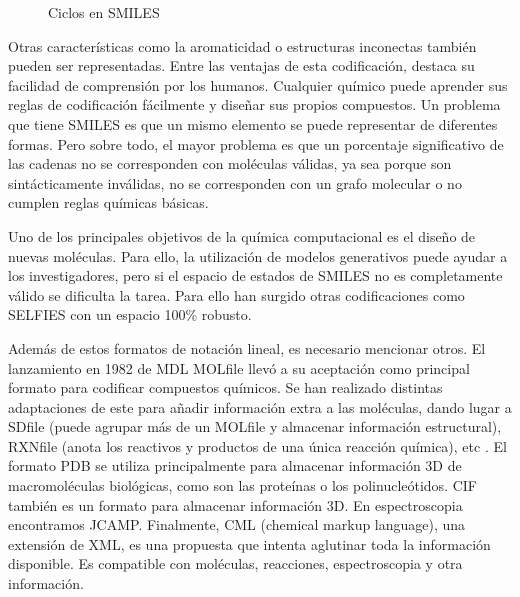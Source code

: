 \begin{figure}[H]
\centering
    \caption{Ciclos en SMILES} 
\end{figure}

Otras características como la aromaticidad o estructuras inconectas también pueden ser representadas. Entre las ventajas de esta codificación, destaca su facilidad de comprensión por los humanos. Cualquier químico puede aprender sus reglas de codificación fácilmente y diseñar sus propios compuestos. Un problema que tiene SMILES es que un mismo elemento se puede representar de diferentes formas. Pero sobre todo, el mayor problema es que un porcentaje significativo de las cadenas no se corresponden con moléculas válidas, ya sea porque son sintácticamente inválidas, no se corresponden con un grafo molecular o no cumplen reglas químicas básicas. \cite{weininger1988smiles}

Uno de los principales objetivos de la química computacional es el diseño de nuevas moléculas. Para ello, la utilización de modelos generativos puede ayudar a los investigadores, pero si el espacio de estados de SMILES no es completamente válido se dificulta la tarea. Para ello han surgido otras codificaciones como SELFIES con un espacio 100\% robusto. \cite{Krenn_2020}

Además de estos formatos de notación lineal, es necesario mencionar otros. El lanzamiento en 1982 de MDL MOLfile llevó a su aceptación como principal formato para codificar compuestos químicos. Se han realizado distintas adaptaciones de este para añadir información extra a las moléculas, dando lugar a SDfile (puede agrupar más de un MOLfile y almacenar información estructural), RXNfile (anota los reactivos y productos de una única reacción química), etc \cite{doi:10.1021/ci00007a012}. El formato PDB se utiliza principalmente para almacenar información 3D de macromoléculas biológicas, como son las proteínas o los polinucleótidos. CIF también es un formato para almacenar información 3D. En espectroscopia encontramos JCAMP. Finalmente, CML (chemical markup language), una extensión de XML, es una propuesta que intenta aglutinar toda la información disponible. Es compatible con moléculas, reacciones, espectroscopia y otra información. \cite{doi:10.1021/ci600234z}

